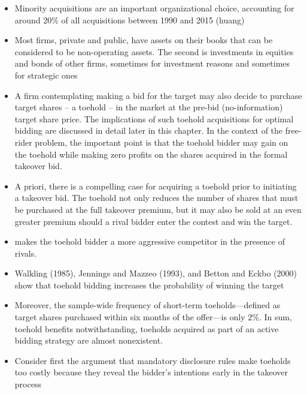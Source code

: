 \documentclass[12pt]{article}
\begin{document}
    \begin{itemize}

        \item Minority acquisitions are an important organizational choice, accounting for around 20\% of all acquisitions between 1990 and 2015 (huang)

        \item Most firms, private and public, have assets on their books that can be considered to be non-operating assets. The second is investments in equities and bonds of other firms, sometimes for investment reasons and sometimes for strategic ones \citep{Damodaran2005}

        \item A firm contemplating making a bid for the target may also decide to purchase target shares -- a toehold -- in the market at the pre-bid (no-information) target share price. The implications of such toehold acquisitions for optimal bidding are discussed in detail later in this chapter. In the context of the free-rider problem, the important point is that the toehold bidder may gain on the toehold while making zero profits on the shares acquired in the formal takeover bid. \citep{Mitchell2011}

        \item A priori, there is a compelling case for acquiring a toehold prior to initiating a takeover bid. The toehold not only reduces the number of shares that must be purchased at the full takeover premium, but it may also be sold at an even greater premium should a rival bidder enter the contest and win the target. \citep{Mitchell2011}

        \item makes the toehold bidder a more aggressive competitor in the presence of rivals. \citep{Mitchell2011}

        \item Walkling (1985), Jennings and Mazzeo (1993), and Betton and Eckbo (2000) show that toehold bidding increases the probability of winning the target \citep{Mitchell2011}

        \item Moreover, the sample-wide frequency of short-term toeholds—defined as target shares purchased within six months of the offer—is only 2\%. In sum, toehold benefits notwithstanding, toeholds acquired as part of an active bidding strategy are almost nonexistent. \citep{Mitchell2011}

        \item Consider first the argument that mandatory disclosure rules make toeholds too costly because they reveal the bidder’s intentions early in the takeover process \citep{Mitchell2011}


\end{itemize}
\end{document}
